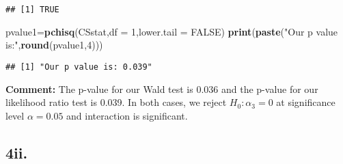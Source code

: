 \documentclass[]{article}
\newenvironment{Shaded}{\begin{snugshade}}{\end{snugshade}}
\newcommand{\DataTypeTok}[1]{\textcolor[rgb]{0.13,0.29,0.53}{#1}}
\newcommand{\DecValTok}[1]{\textcolor[rgb]{0.00,0.00,0.81}{#1}}
\newcommand{\KeywordTok}[1]{\textcolor[rgb]{0.13,0.29,0.53}{\textbf{#1}}}
\newcommand{\NormalTok}[1]{#1}
\newcommand{\OtherTok}[1]{\textcolor[rgb]{0.56,0.35,0.01}{#1}}
\newcommand{\StringTok}[1]{\textcolor[rgb]{0.31,0.60,0.02}{#1}}
\begin{document}
\begin{verbatim}
## [1] TRUE
\end{verbatim}

\begin{Shaded}
\begin{Highlighting}[]
\NormalTok{pvalue1=}\KeywordTok{pchisq}\NormalTok{(CSstat,}\DataTypeTok{df =} \DecValTok{1}\NormalTok{,}\DataTypeTok{lower.tail =} \OtherTok{FALSE}\NormalTok{)}
\KeywordTok{print}\NormalTok{(}\KeywordTok{paste}\NormalTok{(}\StringTok{"Our p value is:"}\NormalTok{,}\KeywordTok{round}\NormalTok{(pvalue1,}\DecValTok{4}\NormalTok{)))}
\end{Highlighting}
\end{Shaded}

\begin{verbatim}
## [1] "Our p value is: 0.039"
\end{verbatim}

\textbf{Comment:} The p-value for our Wald test is 0.036 and the p-value
for our likelihood ratio test is 0.039. In both cases, we reject
\(H_0: \alpha_3=0\) at significance level \(\alpha=0.05\) and
interaction is significant.

\hypertarget{ii.-2}{%
\subsection{4ii.}\label{ii.-2}}
\end{document}
